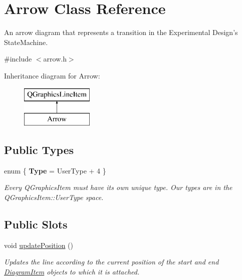 \hypertarget{class_arrow}{\section{Arrow Class Reference}
\label{class_arrow}
}


An arrow diagram that represents a transition in the Experimental Design's State\-Machine.  




{\ttfamily \#include $<$arrow.\-h$>$}

Inheritance diagram for Arrow\-:\begin{figure}[H]
\begin{center}
\leavevmode
\includegraphics[height=2.000000cm]{class_arrow}
\end{center}
\end{figure}
\subsection*{Public Types}
\begin{DoxyCompactItemize}
\item 
enum \{ {\bfseries Type} = User\-Type + 4
 \}
\begin{DoxyCompactList}\small\item\em Every Q\-Graphics\-Item must have its own unique type. Our types are in the Q\-Graphics\-Item\-::\-User\-Type space. \end{DoxyCompactList}\end{DoxyCompactItemize}
\subsection*{Public Slots}
\begin{DoxyCompactItemize}
\item 
\hypertarget{class_arrow_a2c78180ebf1b7d26cd52ce630ad9f2ac}{void \hyperlink{class_arrow_a2c78180ebf1b7d26cd52ce630ad9f2ac}{update\-Position} ()}\label{class_arrow_a2c78180ebf1b7d26cd52ce630ad9f2ac}

\begin{DoxyCompactList}\small\item\em Updates the line according to the current position of the start and end \hyperlink{class_diagram_item}{Diagram\-Item} objects to which it is attached. \end{DoxyCompactList}\end{DoxyCompactItemize}
